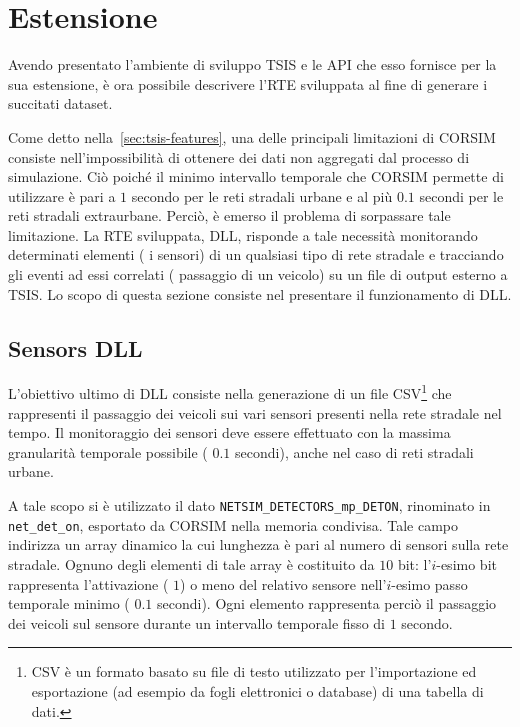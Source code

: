 \cleardoublepage
\section{Estensione}\label{sec:sensors-rte}
Avendo presentato l'ambiente di sviluppo \acs{TSIS} e le \acs{API} che esso fornisce per la sua estensione, è ora possibile descrivere l'\acl{RTE} sviluppata al fine di generare i succitati dataset.

Come detto nella~\vref{sec:tsis-features}, una delle principali limitazioni di \acs{CORSIM} consiste nell'impossibilità di ottenere dei dati non aggregati dal processo di simulazione. Ciò poiché il minimo intervallo temporale che \acs{CORSIM} permette di utilizzare è pari a $1$ secondo per le reti stradali urbane e al più $0.1$ secondi per le reti stradali extraurbane. Perciò, è emerso il problema di sorpassare tale limitazione. La \acs{RTE} sviluppata,  \acs{DLL}, risponde a tale necessità monitorando determinati elementi (\ie{} i sensori) di un qualsiasi tipo di rete stradale e tracciando gli eventi ad essi correlati (\ie{} passaggio di un veicolo) su un file di output esterno a \acs{TSIS}. Lo scopo di questa sezione consiste nel presentare il funzionamento di  \acs{DLL}.

\subsection{Sensors DLL}
L'obiettivo ultimo di  \acs{DLL} consiste nella generazione di un file \acs{CSV}\footnote{\acf{CSV} è un formato basato su file di testo utilizzato per l'importazione ed esportazione (ad esempio da fogli elettronici o database) di una tabella di dati.} che rappresenti il passaggio dei veicoli sui vari sensori presenti nella rete stradale nel tempo. Il monitoraggio dei sensori deve essere effettuato con la massima granularità temporale possibile (\ie{} $0.1$ secondi), anche nel caso di reti stradali urbane.

A tale scopo si è utilizzato il dato \lstinline[]|NETSIM_DETECTORS_mp_DETON|, rinominato in \lstinline[]|net_det_on|, esportato da \acs{CORSIM} nella memoria condivisa. Tale campo indirizza un array dinamico la cui lunghezza è pari al numero di sensori sulla rete stradale. Ognuno degli elementi di tale array è costituito da $10$ bit: l'$i$-esimo bit rappresenta l'attivazione (\ie{} $1$) o meno del relativo sensore nell'$i$-esimo passo temporale minimo (\ie{} $0.1$ secondi). Ogni elemento rappresenta perciò il passaggio dei veicoli sul sensore durante un intervallo temporale fisso di $1$ secondo.

